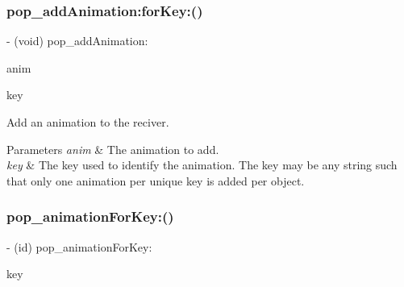 \subsubsection{\texorpdfstring{pop\+\_\+add\+Animation\+:for\+Key\+:()}{pop\_addAnimation:forKey:()}\hspace{0.1cm}{\footnotesize\ttfamily [3/3]}}
{\footnotesize\ttfamily -\/ (void) pop\+\_\+add\+Animation\+: \begin{DoxyParamCaption}\item[{(\mbox{\hyperlink{interface_p_o_p_animation}{P\+O\+P\+Animation}} $\ast$)}]{anim }\item[{forKey:(N\+S\+String $\ast$)}]{key }\end{DoxyParamCaption}}

Add an animation to the reciver. 
\begin{DoxyParams}{Parameters}
{\em anim} & The animation to add. \\
\hline
{\em key} & The key used to identify the animation.  The \textquotesingle{}key\textquotesingle{} may be any string such that only one animation per unique key is added per object. \\
\hline
\end{DoxyParams}
\mbox{\label{category_n_s_object_07_p_o_p_08_a517e269829d65c37f0541e49a3d18210}} 
\subsubsection{\texorpdfstring{pop\+\_\+animation\+For\+Key\+:()}{pop\_animationForKey:()}\hspace{0.1cm}{\footnotesize\ttfamily [1/3]}}
{\footnotesize\ttfamily -\/ (id) pop\+\_\+animation\+For\+Key\+: \begin{DoxyParamCaption}\item[{(N\+S\+String $\ast$)}]{key }\end{DoxyParamCaption}}

